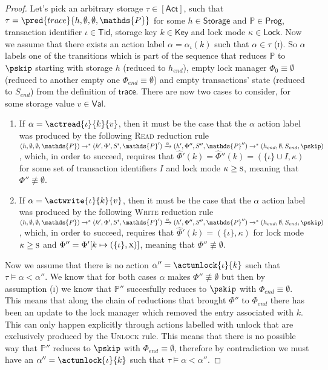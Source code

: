 \begin{proof}
Let's pick an arbitrary storage $\tau \in \mathsf{[Act]}$, such that $\tau = \pred{trace}{h, \emptyset, \emptyset, \mathds{P}}$ for some $h \in \mathsf{Storage}$ and $\mathds{P} \in \mathsf{Prog}$, transaction identifier $\iota \in \mathsf{Tid}$, storage key $k \in \mathsf{Key}$ and lock mode $\kappa \in \mathsf{Lock}$. Now we assume that there exists an action label $\alpha = \alpha_\iota(k)$ such that $\alpha \in \tau$ (\textsc{i}). So $\alpha$ labels one of the transitions which is part of the sequence that reduces $\mathds{P}$ to $\pskip$ starting with storage $h$ (reduced to $h_{end}$), empty lock manager $\Phi_0 \equiv \emptyset$ (reduced to another empty one $\Phi_{end} \equiv \emptyset$) and empty transactions' state (reduced to $S_{end}$) from the definition of $\mathsf{trace}$. There are now two cases to consider, for some storage value $v \in \mathsf{Val}$.
\begin{enumerate}
\item If $\alpha = \actread{\iota}{k}{v}$, then it must be the case that the $\alpha$ action label was produced by the following \textsc{Read} reduction rule $(h, \emptyset, \emptyset, \mathds{P}) \rightarrow^* (h', \Phi', S', \mathds{P}') \xrightarrow{\alpha} (h', \Phi'', S'', \mathds{P}'') \rightarrow^* (h_{end}, \emptyset, S_{end}, \pskip)$, which, in order to succeed, requires that $\hat{\Phi}'(k) = \hat{\Phi}''(k) = (\{ \iota \} \cup I, \kappa)$ for some set of transaction identifiers $I$ and lock mode $\kappa \geq \textsc{s}$, meaning that $\Phi'' \not\equiv \emptyset$.
\item If $\alpha = \actwrite{\iota}{k}{v}$, then it must be the case that the $\alpha$ action label was produced by the following \textsc{Write} reduction rule $(h, \emptyset, \emptyset, \mathds{P}) \rightarrow^* (h', \Phi', S', \mathds{P}') \xrightarrow{\alpha} (h', \Phi'', S'', \mathds{P}'') \rightarrow^* (h_{end}, \emptyset, S_{end}, \pskip)$, which, in order to succeed, requires that $\hat{\Phi}'(k) = (\{ \iota \}, \kappa)$ for lock mode $\kappa \geq \textsc{s}$ and $\Phi'' = \Phi'[k \mapsto (\{\iota\}, \textsc{x})]$, meaning that $\Phi'' \not\equiv \emptyset$.
\end{enumerate}

Now we assume that there is no action $\alpha'' = \actunlock{\iota}{k}$ such that $\tau \vDash \alpha < \alpha ''$. We know that for both cases $\alpha$ makes $\Phi'' \not\equiv \emptyset$ but then by assumption (\textsc{i}) we know that $\mathds{P}''$ succesfully reduces to $\pskip$ with $\Phi_{end} \equiv \emptyset$. This means that along the chain of reductions that brought $\Phi''$ to $\Phi_{end}$ there has been an update to the lock manager which removed the entry associated with $k$. This can only happen explicitly through actions labelled with \textsf{unlock} that are exclusively produced by the \textsc{Unlock} rule. This means that there is no possible way that $\mathds{P}''$ reduces to $\pskip$ with $\Phi_{end} \equiv \emptyset$, therefore by contradiction we must have an $\alpha'' = \actunlock{\iota}{k}$ such that $\tau \vDash \alpha < \alpha ''$.
\end{proof}

